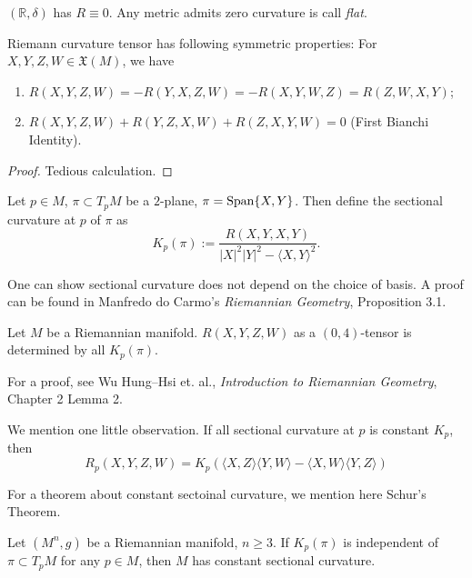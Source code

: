 \begin{eg}
    $(\mathbb{R},\delta)$ has $R\equiv 0$.
    Any metric admits zero curvature is call \emph{flat}.
\end{eg}

\begin{prop}
    Riemann curvature tensor has following symmetric properties: For $X,Y,Z,W\in\mathfrak{X}(M)$, we have
    \begin{enumerate}[(1)]
        \item $R(X,Y,Z,W)=-R(Y,X,Z,W)=-R(X,Y,W,Z)=R(Z,W,X,Y)$;
        \item $R(X,Y,Z,W)+R(Y,Z,X,W)+R(Z,X,Y,W)=0$ (First Bianchi Identity).
    \end{enumerate}
\end{prop}
\begin{proof}
    Tedious calculation.
\end{proof}

\begin{defn}
    Let $p\in M$, $\pi\subset T_pM$ be a $2$-plane, $\pi=\operatorname{Span}\{X,Y\}$.
    Then define the sectional curvature at $p$ of $\pi$ as
    \[K_p(\pi):=\frac{R(X,Y,X,Y)}{|X|^2|Y|^2-\langle X,Y\rangle^2}.\]
\end{defn}

\begin{rem}
    One can show sectional curvature does not depend on the choice of basis.
    A proof can be found in Manfredo do Carmo's \emph{Riemannian Geometry}, Proposition 3.1.
\end{rem}

\begin{prop}
    Let $M$ be a Riemannian manifold.
    $R(X,Y,Z,W)$ as a $(0,4)$-tensor is determined by all $K_p(\pi)$.
\end{prop}
For a proof, see Wu Hung--Hsi et. al., \emph{Introduction to Riemannian Geometry}, Chapter 2 Lemma 2.

We mention one little observation.
If all sectional curvature at $p$ is constant $K_p$, then
\[R_p(X,Y,Z,W)=K_p(\langle X,Z\rangle\langle Y,W\rangle-\langle X,W\rangle\langle Y,Z\rangle)\]

For a theorem about constant sectoinal curvature, we mention here Schur's Theorem.
\begin{thm}[Schur]
    Let $(M^n,g)$ be a Riemannian manifold, $n\geq 3$.
    If $K_p(\pi)$ is independent of $\pi\subset T_pM$ for any $p\in M$, then $M$ has constant sectional curvature.
\end{thm}

